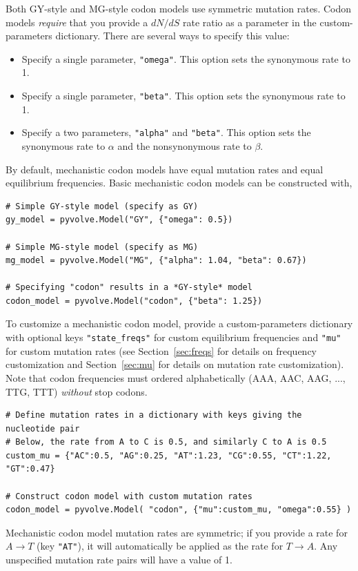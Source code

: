 \documentclass{article}
\newcommand{\code}[1]{\texttt{\small{#1}}}
\begin{document}
Both GY-style and MG-style codon models use symmetric mutation rates. Codon models \emph{require} that you provide a $dN/dS$ rate ratio as a parameter in the custom-parameters dictionary. There are several ways to specify this value:
\begin{itemize}
	\item Specify a single parameter, \code{"omega"}. This option sets the synonymous rate to 1.
	\item Specify a single parameter, \code{"beta"}. This option sets the synonymous rate to 1.
	\item Specify a two parameters, \code{"alpha"} and \code{"beta"}. This option sets the synonymous rate to $\alpha$ and the nonsynonymous rate to $\beta$.
\end{itemize}

By default, mechanistic codon models have equal mutation rates and equal equilibrium frequencies. Basic mechanistic codon models can be constructed with,
\begin{lstlisting}
# Simple GY-style model (specify as GY)
gy_model = pyvolve.Model("GY", {"omega": 0.5})

# Simple MG-style model (specify as MG)
mg_model = pyvolve.Model("MG", {"alpha": 1.04, "beta": 0.67})

# Specifying "codon" results in a *GY-style* model
codon_model = pyvolve.Model("codon", {"beta": 1.25})
\end{lstlisting}

To customize a mechanistic codon model, provide a custom-parameters dictionary with optional keys \code{"state\_freqs"} for custom equilibrium frequencies and \code{"mu"} for custom mutation rates (see Section~\ref{sec:freqs} for details on frequency customization and Section~\ref{sec:mu} for details on mutation rate customization). Note that codon frequencies must ordered alphabetically (AAA, AAC, AAG, ..., TTG, TTT) \emph{without} stop codons.

\begin{lstlisting}
# Define mutation rates in a dictionary with keys giving the nucleotide pair
# Below, the rate from A to C is 0.5, and similarly C to A is 0.5
custom_mu = {"AC":0.5, "AG":0.25, "AT":1.23, "CG":0.55, "CT":1.22, "GT":0.47}

# Construct codon model with custom mutation rates
codon_model = pyvolve.Model( "codon", {"mu":custom_mu, "omega":0.55} )
\end{lstlisting}


Mechanistic codon model mutation rates are symmetric; if you provide a rate for $A \rightarrow T$ (key \code{"AT"}), it will automatically be applied as the rate for $T \rightarrow A$. Any unspecified mutation rate pairs will have a value of 1.
\end{document}
